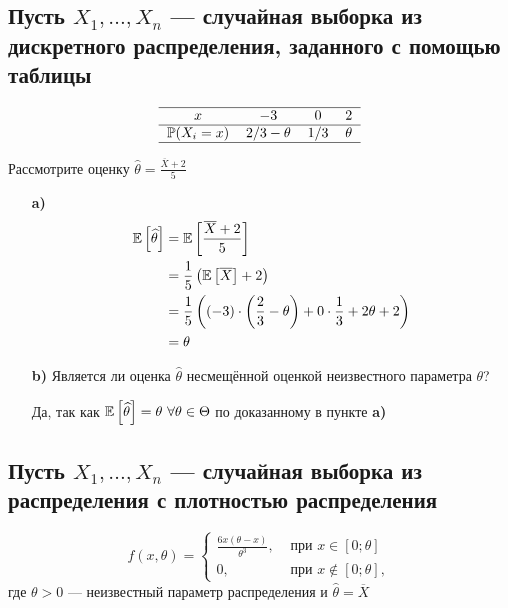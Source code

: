 \documentclass{article}
\begin{document}
\subsection{Пусть $X_1,\ldots, X_n$ — случайная выборка из дискретного распределения, заданного с помощью таблицы}
\begin{equation*}
    \begin{tabular}{cccc}
        \hline
        $x$ & $-3$ & $0$ & $2$\\
        \hline
        $\mathbb{P}(X_i=x)$ & $2/3-\theta$ & 1/3 & $\theta$\\
        \hline
    \end{tabular}
\end{equation*}

Рассмотрите оценку $\widehat{\theta}=\displaystyle\frac{\overline{X}+2}{5}$
\begin{itemize}
    \item[\textbf{a)}] \begin{equation*}
        \begin{aligned}
            \mathbb{E}\left[\widehat{\theta}\right]&=\mathbb{E}\left[\frac{\overline{X}+2}{5}\right]\\
            &=\frac{1}{5}\left(\mathbb{E}\left[\overline{X}\right]+2\right)\\
            &=\frac{1}{5}\left((-3)\cdot\left(\frac{2}{3}-\theta\right)+0\cdot\frac{1}{3}+2\theta+2\right)\\
            &=\theta
        \end{aligned}
    \end{equation*}

    \item[\textbf{b)}] Является ли оценка $\widehat{\theta}$ несмещённой оценкой неизвестного параметра $\theta$?
    
    Да, так как $\matwait{\widehat{\theta}}=\theta\ \forall\theta\in\Theta$ по доказанному в пункте \textbf{a)}
\end{itemize}

\subsection{Пусть $X_1,\ldots, X_n$ — случайная выборка из распределения с плотностью распределения}
\begin{equation*}
    f(x,\theta)=\begin{cases}
        \frac{6x(\theta-x)}{\theta^3},&\text{ при }x\in[0;\theta]\\
        0,&\text{ при }x\notin[0;\theta],
    \end{cases}
\end{equation*}
где $\theta>0$ — неизвестный параметр распределения и $\hat{\theta}=\overline{X}$
\end{document}
